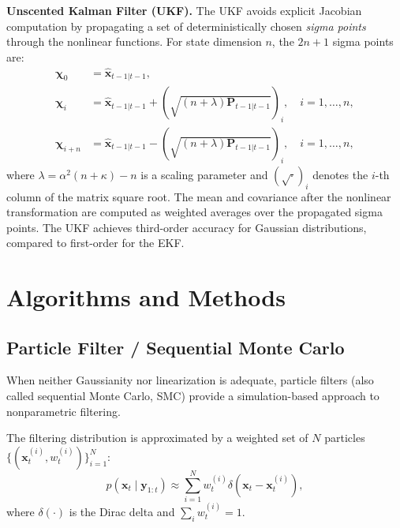 \documentclass[conference]{IEEEtran}
\begin{document}
\textbf{Unscented Kalman Filter (UKF).} The UKF \cite{julier1997new} avoids explicit Jacobian computation by propagating a set of deterministically chosen \emph{sigma points} through the nonlinear functions. For state dimension $n$, the $2n+1$ sigma points are:
\begin{align}
\boldsymbol{\chi}_0 &= \hat{\mathbf{x}}_{t-1|t-1}, \\
\boldsymbol{\chi}_i &= \hat{\mathbf{x}}_{t-1|t-1} + \left(\sqrt{(n+\lambda)\mathbf{P}_{t-1|t-1}}\right)_i, \quad i = 1,\ldots,n, \\
\boldsymbol{\chi}_{i+n} &= \hat{\mathbf{x}}_{t-1|t-1} - \left(\sqrt{(n+\lambda)\mathbf{P}_{t-1|t-1}}\right)_i, \quad i = 1,\ldots,n,
\end{align}
where $\lambda = \alpha^2(n+\kappa) - n$ is a scaling parameter and $(\sqrt{\cdot})_i$ denotes the $i$-th column of the matrix square root. The mean and covariance after the nonlinear transformation are computed as weighted averages over the propagated sigma points. The UKF achieves third-order accuracy for Gaussian distributions, compared to first-order for the EKF.

\section{Algorithms and Methods}
\label{sec:algorithms}

\subsection{Particle Filter / Sequential Monte Carlo}

When neither Gaussianity nor linearization is adequate, particle filters (also called sequential Monte Carlo, SMC) \cite{gordon1993novel,doucet2001sequential} provide a simulation-based approach to nonparametric filtering.

The filtering distribution is approximated by a weighted set of $N$ particles $\{(\mathbf{x}_t^{(i)}, w_t^{(i)})\}_{i=1}^{N}$:
\begin{equation}
p(\mathbf{x}_t \mid \mathbf{y}_{1:t}) \approx \sum_{i=1}^{N} w_t^{(i)} \delta(\mathbf{x}_t - \mathbf{x}_t^{(i)}),
\end{equation}
where $\delta(\cdot)$ is the Dirac delta and $\sum_i w_t^{(i)} = 1$.
\end{document}
